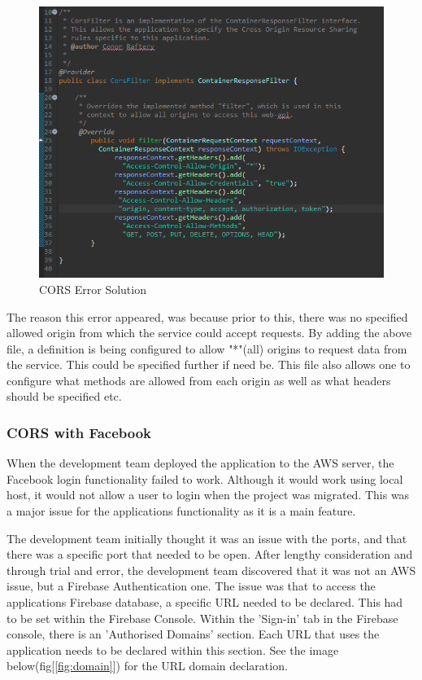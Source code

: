 \begin{figure}[H]
    \centering
    \includegraphics[width=\textwidth, height=250pt]{img/CORS2.PNG}
    \caption{CORS Error Solution}
    \label{fig:corsFix}
\end{figure}

\bigskip

The reason this error appeared, was because prior to this, there was no specified allowed origin from which the service could accept requests. By adding the above file, a definition is being configured to allow "*"(all) origins to request data from the service. This could be specified further if need be. This file also allows one to configure what methods are allowed from each origin as well as what headers should be specified etc.

\subsubsection{CORS with Facebook}
\label{sec:SystemEvaluationFacebook}
When the development team deployed the application to the AWS server, the Facebook login functionality failed to work. Although it would work using local host, it would not allow a user to login when the project was migrated. This was a major issue for the applications functionality as it is a main feature. 

\bigskip

The development team initially thought it was an issue with the ports, and that there was a specific port that needed to be open. After lengthy consideration and through trial and error, the development team discovered that it was not an AWS issue, but a Firebase Authentication one. The issue was that to access the applications Firebase database, a specific URL needed to be declared. This had to be set within the Firebase Console. Within the 'Sign-in' tab in the Firebase console, there is an 'Authorised Domains' section. Each URL that uses the application needs to be declared within this section. See the image below(fig[\ref{fig:domain}]) for the URL domain declaration.


